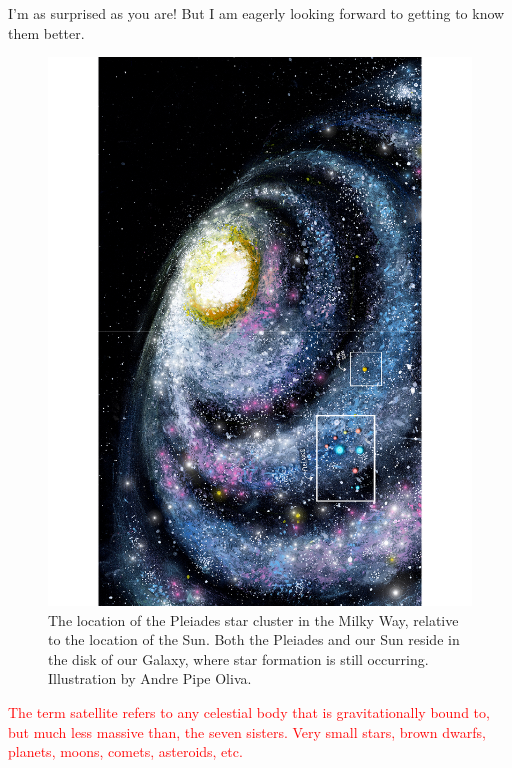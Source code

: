 \documentclass[main.tex]{subfiles}
\begin{document}
\par \Electra I'm as surprised as you are!  But I am eagerly looking forward to getting to know them better.

\begin{figure}
\includegraphics[width=\columnwidth,angle=270,origin=c]{ch1_5.pdf}
\caption{The location of the Pleiades star cluster in the Milky Way, relative to the location of the Sun.  Both the Pleiades and our Sun reside in the disk of our Galaxy, where star formation is still occurring.  Illustration by Andre Pipe Oliva.
\label{fig:fig5}}
\end{figure}


\begin{tcolorbox}[sharp corners, colback=red!30, colframe=red!80!blue, title=Satellites]
\par \textcolor{red} {The term satellite refers to any celestial body that is gravitationally bound to, but much less massive than, the seven sisters.  Very small stars, brown dwarfs, planets, moons, comets, asteroids, etc.} 
\end{tcolorbox} 
\end{document}
